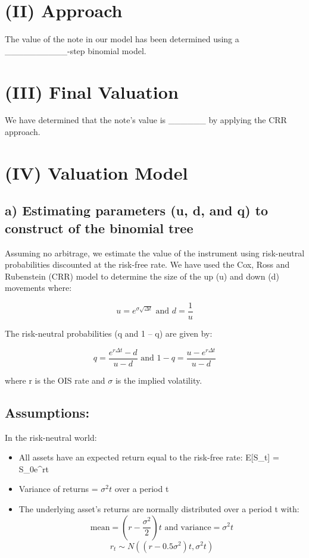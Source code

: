 \documentclass[12pt]{article}
\begin{document}
\section*{(II) Approach}
The value of the note in our model has been determined using a \_\_\_\_\_\_\_\_\_\_-step binomial model. 

\section*{(III) Final Valuation}
We have determined that the note's value is \_\_\_\_\_\_ by applying the CRR approach.

\section*{(IV) Valuation Model}

\subsection*{a) Estimating parameters (u, d, and q) to construct of the binomial tree}
Assuming no arbitrage, we estimate the value of the instrument using risk-neutral probabilities discounted at the risk-free rate. We have used the Cox, Ross and Rubenstein (CRR) model to determine the size of the up (u) and down (d) movements where:

\begin{equation}
u = e^{\sigma\sqrt{\Delta t}} \text{ and } d = \frac{1}{u}
\end{equation}

The risk-neutral probabilities (q and 1 -- q) are given by:

\begin{equation}
q = \frac{e^{r\Delta t} - d}{u - d} \text{ and } 1-q = \frac{u - e^{r\Delta t}}{u - d}
\end{equation}

where r is the OIS rate and $\sigma$ is the implied volatility.

\subsection*{Assumptions:}
In the risk-neutral world:
\begin{itemize}
\item All assets have an expected return equal to the risk-free rate: E[S_t] = S_0e^{rt}
\item Variance of returns = $\sigma^2t$ over a period t
\item The underlying asset's returns are normally distributed over a period t with:
\begin{equation}
\text{mean} = \left(r - \frac{\sigma^2}{2}\right)t \text{ and variance} = \sigma^2t
\end{equation}
\begin{equation}
r_t \sim N\left(\left(r - 0.5\sigma^2\right)t, \sigma^2t\right)
\end{equation}
\end{itemize}
\end{document}
